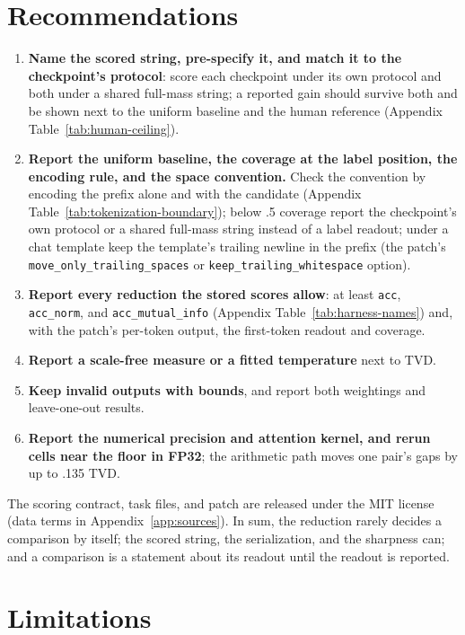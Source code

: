 \documentclass[11pt]{article}
\begin{document}
\section{Recommendations}
\label{sec:recommendations}

\begin{enumerate}[leftmargin=*,itemsep=1pt,topsep=2pt]
\item \textbf{Name the scored string, pre-specify it, and match it to the checkpoint's protocol}: score each checkpoint under its own protocol and both under a shared full-mass string; a reported gain should survive both and be shown next to the uniform baseline and the human reference (Appendix Table~\ref{tab:human-ceiling}).
\item \textbf{Report the uniform baseline, the coverage at the label position, the encoding rule, and the space convention.} Check the convention by encoding the prefix alone and with the candidate (Appendix Table~\ref{tab:tokenization-boundary}); below .5 coverage report the checkpoint's own protocol or a shared full-mass string instead of a label readout; under a chat template keep the template's trailing newline in the prefix (the patch's \texttt{move\_only\_trailing\_spaces} or \texttt{keep\_trailing\_whitespace} option).
\item \textbf{Report every reduction the stored scores allow}: at least \texttt{acc}, \texttt{acc\_norm}, and \texttt{acc\_mutual\_info} (Appendix Table~\ref{tab:harness-names}) and, with the patch's per-token output, the first-token readout and coverage.
\item \textbf{Report a scale-free measure or a fitted temperature} next to TVD.
\item \textbf{Keep invalid outputs with bounds}, and report both weightings and leave-one-out results.
\item \textbf{Report the numerical precision and attention kernel, and rerun cells near the floor in FP32}; the arithmetic path moves one pair's gaps by up to .135 TVD.
\end{enumerate}
The scoring contract, task files, and patch are released under the MIT license (data terms in Appendix~\ref{app:sources}). In sum, the reduction rarely decides a comparison by itself; the scored string, the serialization, and the sharpness can; and a comparison is a statement about its readout until the readout is reported.

\FloatBarrier

\section*{Limitations}
\end{document}
